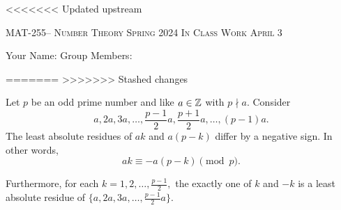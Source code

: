 \documentclass[handout]{ximera}
\date{April 3, 2024}
\date{\classday, 2024}
\begin{document}
\handoutAbstract
\maketitle
<<<<<<< Updated upstream
 	\begin{center}%
    	{\large \scshape MAT-255-- Number Theory 
			\hfill Spring 2024 
			\hfill In Class Work April 3}%
    
		{\large Your Name: \hrulefill \quad 
			Group Members:\hrulefill \quad 
			\hrulefill
			\par}%
 	\end{center}%
=======
>>>>>>> Stashed changes
	 
\begin{lemma}\label{lem:residues-gauss-lem}
    Let $p$ be an odd prime number and like $a\in\mathbb Z$ with $p\nmid a.$ Consider  
        \[a,2a,3a,\dots,\frac{p-1}{2}a,\frac{p+1}{2}a,\dots,(p-1)a.\] 
    The least absolute residues of $ak$ and $a(p-k)$ differ by a negative sign. In other words, 
        \[ak\equiv -a(p-k)\pmod{p}.\]
        
    Furthermore, for each $k=1,2,\dots,\frac{p-1}{2},$ the exactly one of $k$ and $-k$ is a least absolute residue of $\{a,2a,3a,\dots,\frac{p-1}{2}a\}.$
\end{lemma}
\end{document}
